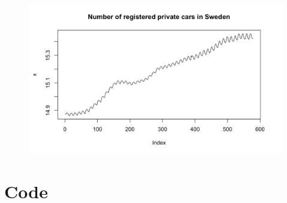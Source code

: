\documentclass[a4paper,11pt]{article}
\begin{document}
    \begin{figure}[H]
        \centering
        \includegraphics[width=1\textwidth]{log-transformed.png}
        \label{fig:f2}
    \end{figure}

    
    

    \newpage
    \appendix
    \section{Code}
    
\end{document}
